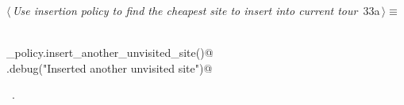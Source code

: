 \documentclass[11.5pt]{report}
\begin{document}
\begin{flushleft} \small\label{scrap25}\raggedright\small
{} $\langle\,${\itshape Use insertion policy to find the cheapest site to insert into current tour}\nobreak\ {\footnotesize {33a}}$\,\rangle\equiv$
\vspace{-1ex}
\begin{list}{}{} \item
\mbox{}\verb@@\\
\mbox{}\verb@insertion_policy.insert_another_unvisited_site()@\\
\mbox{}\verb@logger.debug("Inserted another unvisited site")@\\
\mbox{}\verb@@{\NWsep}
\end{list}
\vspace{-1.5ex}
\footnotesize
\begin{list}{}{\setlength{\itemsep}{-\parsep}\setlength{\itemindent}{-\leftmargin}}
\item \NWtxtMacroRefIn\ .

\item{}
\end{list}
\vspace{4ex}
\end{flushleft}
\newchunk 
\end{document}
